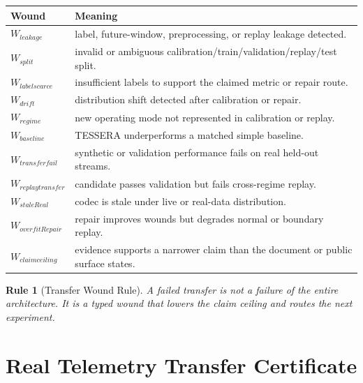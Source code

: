 \documentclass[12pt]{article}
\newtheorem{rulebox}{Rule}
\begin{document}
\begin{longtable}{p{}p{}}
\toprule
\textbf{Wound} & \textbf{Meaning} \\
\midrule
$W_{leakage}$ & label, future-window, preprocessing, or replay leakage detected. \\
$W_{split}$ & invalid or ambiguous calibration/train/validation/replay/test split. \\
$W_{labelscarce}$ & insufficient labels to support the claimed metric or repair route. \\
$W_{drift}$ & distribution shift detected after calibration or repair. \\
$W_{regime}$ & new operating mode not represented in calibration or replay. \\
$W_{baseline}$ & TESSERA underperforms a matched simple baseline. \\
$W_{transferfail}$ & synthetic or validation performance fails on real held-out streams. \\
$W_{replaytransfer}$ & candidate passes validation but fails cross-regime replay. \\
$W_{staleReal}$ & codec is stale under live or real-data distribution. \\
$W_{overfitRepair}$ & repair improves wounds but degrades normal or boundary replay. \\
$W_{claimceiling}$ & evidence supports a narrower claim than the document or public surface states. \\
\bottomrule
\end{longtable}

\begin{rulebox}[Transfer Wound Rule]
A failed transfer is not a failure of the entire architecture. It is a typed
wound that lowers the claim ceiling and routes the next experiment.
\end{rulebox}

\section{Real Telemetry Transfer Certificate}
\end{document}
